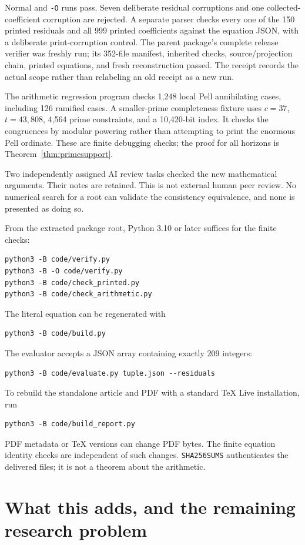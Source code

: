\documentclass[11pt]{article}
\theoremstyle{definition}
\theoremstyle{remark}
\begin{document}
Normal and \texttt{-O} runs pass. Seven deliberate residual corruptions
and one collected-coefficient corruption are rejected. A separate parser
checks every one of the 150 printed residuals and all 999 printed
coefficients against the equation JSON, with a deliberate print-corruption
control. The parent package's complete release verifier was freshly run;
its 352-file manifest, inherited checks, source/projection chain, printed
equations, and fresh reconstruction passed. The receipt records the
actual scope rather than relabeling an old receipt as a new run.

The arithmetic regression program checks 1,248 local Pell annihilating
cases, including 126 ramified cases. A smaller-prime completeness fixture
uses $c=37$, $t=43,808$, 4,564 prime constraints, and a 10,420-bit index.
It checks the congruences by modular powering rather than attempting to
print the enormous Pell ordinate. These are finite debugging checks;
the proof for all horizons is Theorem~\ref{thm:primesupport}.

Two independently assigned AI review tasks checked the new mathematical
arguments. Their notes are retained. This is not external human peer review.
No numerical search for a root can validate the consistency equivalence,
and none is presented as doing so.

From the extracted package root, Python 3.10 or later suffices for the
finite checks:
\begin{verbatim}
python3 -B code/verify.py
python3 -B -O code/verify.py
python3 -B code/check_printed.py
python3 -B code/check_arithmetic.py
\end{verbatim}
The literal equation can be regenerated with
\begin{verbatim}
python3 -B code/build.py
\end{verbatim}
The evaluator accepts a JSON array containing exactly 209 integers:
\begin{verbatim}
python3 -B code/evaluate.py tuple.json --residuals
\end{verbatim}
To rebuild the standalone article and PDF with a standard TeX Live
installation, run
\begin{verbatim}
python3 -B code/build_report.py
\end{verbatim}
PDF metadata or TeX versions can change PDF bytes. The finite equation
identity checks are independent of such changes. \texttt{SHA256SUMS}
authenticates the delivered files; it is not a theorem about the arithmetic.

\section{What this adds, and the remaining research problem}
\end{document}
